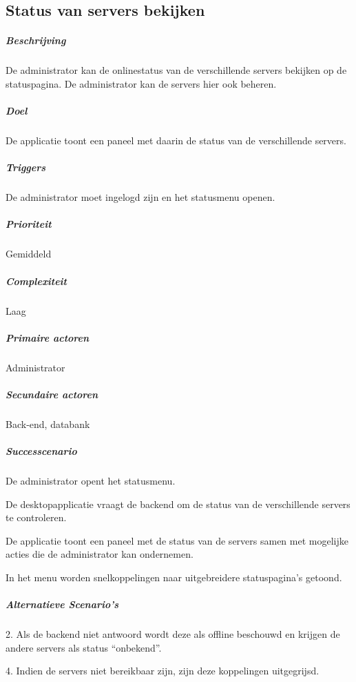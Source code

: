 \subsection{Status van servers bekijken}
\begin{compact}
\subparagraph{Beschrijving} De administrator kan de onlinestatus van de verschillende servers bekijken op de statuspagina. De administrator kan de servers hier ook beheren.
\subparagraph{Doel} De applicatie toont een paneel met daarin de status van de verschillende servers.
\subparagraph{Triggers}De administrator moet ingelogd zijn en het statusmenu openen.
\subparagraph{Prioriteit}Gemiddeld
\subparagraph{Complexiteit}Laag
\subparagraph{Primaire actoren}Administrator
\subparagraph{Secundaire actoren}Back-end, databank
\subparagraph{Successcenario}
\begin{enumerate_compact}
 \item De administrator opent het statusmenu.
 \item De desktopapplicatie vraagt de backend om de status van de verschillende servers te controleren.
 \item De applicatie toont een paneel met de status van de servers samen met mogelijke acties die de administrator kan ondernemen.
 \item In het menu worden snelkoppelingen naar uitgebreidere statuspagina's getoond.
\end{enumerate_compact}
\subparagraph{Alternatieve Scenario's}
\begin{enumerate_compact}
	\item[2.] Als de backend niet antwoord wordt deze als offline beschouwd en krijgen de andere servers als status ``onbekend''.
	\item[4.] Indien de servers niet bereikbaar zijn, zijn deze koppelingen uitgegrijsd.
\end{enumerate_compact}
\end{compact}

